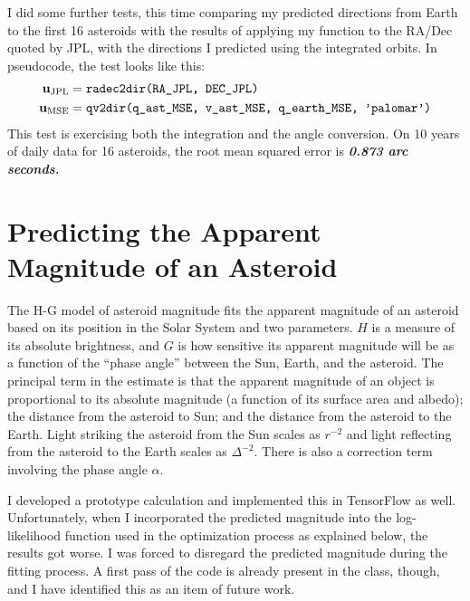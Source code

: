 I did some further tests, this time comparing my predicted directions from Earth to the first 16 asteroids 
with the results of applying my  function to the RA/Dec quoted by JPL,
with the directions I predicted using the integrated orbits.  In pseudocode, the test looks like this:
\begin{align*}
\mathbf{u}_{\mathrm{JPL}} &= \texttt{radec2dir(RA\_JPL, DEC\_JPL)} \\
\mathbf{u}_{\mathrm{MSE}} &= \texttt{qv2dir(q\_ast\_MSE, v\_ast\_MSE, q\_earth\_MSE, 'palomar')}
\end{align*}
This test is exercising both the integration and the angle conversion.
On 10 years of daily data for 16 asteroids, the root mean squared error is \textbf{\emph{0.873 arc seconds.}}

\section{Predicting the Apparent Magnitude of an Asteroid}
\label{section_mag}
The H-G model of asteroid magnitude fits the apparent magnitude of an asteroid based on its 
position in the Solar System and two parameters.
$H$ is a measure of its absolute brightness, and $G$ is how sensitive its apparent magnitude will be as
 a function of the ``phase angle'' between the Sun, Earth, and the asteroid.
The principal term in the estimate is that the apparent magnitude of an object is proportional
to its absolute magnitude (a function of its surface area and albedo); 
the distance from the asteroid to Sun; and the distance from the asteroid to the Earth.
Light striking the asteroid from the Sun scales as $r^{-2}$ 
and light reflecting from the asteroid to the Earth scales as $\Delta^{-2}$.
There is also a correction term involving the phase angle $\alpha$.

I developed a prototype calculation and implemented this in TensorFlow as well.
Unfortunately, when I incorporated the predicted magnitude into the log-likelihood function
used in the optimization process as explained below, the results got worse.
I was forced to disregard the predicted magnitude during the fitting process.
A first pass of the code is already present in the  class, though,
and I have identified this as an item of future work.

